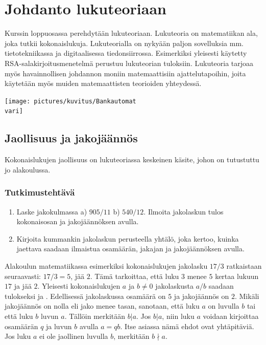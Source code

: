 \chapter{Johdanto lukuteoriaan}


Kurssin loppuosassa perehdytään lukuteoriaan. Lukuteoria on matematiikan ala, joka tutkii kokonaislukuja. Lukuteorialla on nykyään paljon sovelluksia mm. tietotekniikassa ja digitaalisessa tiedonsiirrossa. Esimerkiksi yleisesti käytetty RSA-sala\-kir\-joi\-tus\-me\-ne\-tel\-mä perustuu lukuteorian tuloksiin. Lukuteoria tarjoaa myös havainnollisen johdannon moniin matemaattisiin ajattelutapoihin, joita käytetään myös muiden matemaattisten teorioiden yhteydessä.

\begin{center}
\texttt{[image: pictures/kuvitus/Bankautomat\\vari]}
\end{center}


\section{Jaollisuus ja jakojäännös}
\label{jaollisuus}
Kokonaislukujen jaollisuus on lukuteoriassa keskeinen käsite, johon on tutustuttu jo alakoulussa.

\subsection*{Tutkimustehtävä} %
\begin{enumerate}
\item
Laske jakokulmassa a) $905 / 11$ b) $540 / 12$. Ilmoita jakolaskun tulos kokonaisosan ja jakojäännöksen avulla.
\item
Kirjoita kummankin jakolaskun perusteella yhtälö, joka kertoo, kuinka jaettava saadaan
ilmaistua osamäärän, jakajan ja jakojäännöksen avulla.
\end{enumerate}


Alakoulun matematiikassa esimerkiksi kokonaislukujen jakolasku $17/3$ ratkaistaan seuraavasti: $17/3 = 5$, jää $2$. Tämä tarkoittaa, että luku $3$ menee $5$ kertaa lukuun $17$ ja jää $2$. Yleisesti kokonaislukujen $a$ ja $b \neq 0$ jakolaskusta $a/b$ saadaan tulokseksi  ja . Edellisessä jakolaskussa osamäärä on $5$ ja jakojäännös on $2$. Mikäli jakojäännös on nolla eli jako menee tasan, sanotaan, että luku $a$ on  luvulla $b$ tai että luku $b$  luvun $a$. Tällöin merkitään $b|a$. Jos $b|a$, niin luku $a$ voidaan kirjoittaa osamäärän $q$ ja luvun $b$ avulla $a = qb$. Itse asiassa nämä ehdot ovat yhtäpitäviä. Jos luku $a$ ei ole jaollinen luvulla $b$, merkitään $b \nmid a$.

